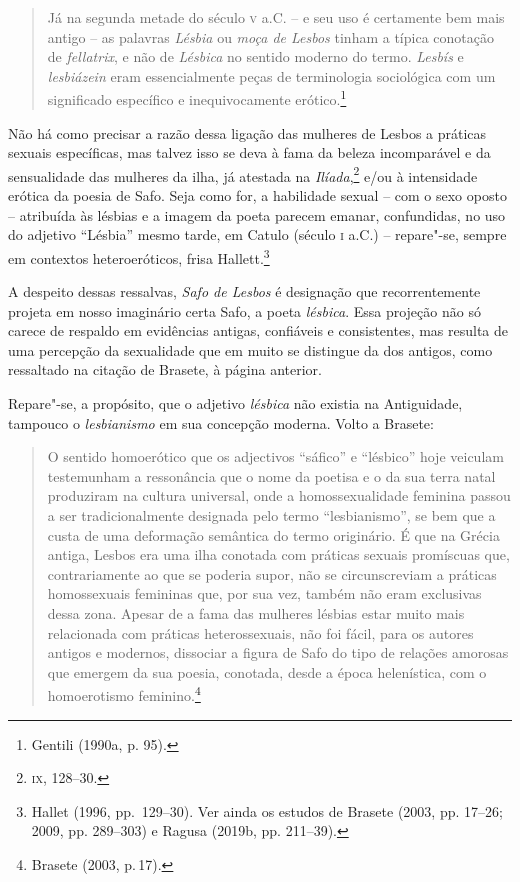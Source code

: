 \begin{quote}
Já na segunda metade do século \textsc{v} a.C. -- e seu uso é certamente bem mais antigo
-- as palavras \textit{Lésbia} ou \textit{moça de Lesbos} tinham a típica
conotação de \textit{fellatrix}, e não de \textit{Lésbica} no sentido moderno
do termo. \textit{Lesbís} e \textit{lesbiázein} eram essencialmente peças de
terminologia sociológica com um significado específico e inequivocamente
erótico.\footnote{ Gentili (1990a, p. 95).}
\end{quote}

Não há como precisar a razão dessa ligação das mulheres de Lesbos a práticas
sexuais específicas, mas talvez isso se deva à fama da beleza incomparável e da
sensualidade das mulheres da ilha, já atestada na \textit{Ilíada},\footnote{\textsc{ix}, 128--30.}
e/ou à intensidade erótica da poesia de Safo. Seja como for, a habilidade
sexual -- com o sexo oposto -- atribuída às lésbias e a imagem da poeta parecem
emanar, confundidas, no uso do adjetivo “Lésbia” mesmo tarde, em Catulo
(século \textsc{i} a.C.) -- repare"-se, sempre em contextos heteroeróticos, frisa Hallett.\footnote{ Hallet 
(1996, pp.~129--30). Ver ainda os estudos de Brasete (2003, pp. 17--26; 2009, pp. 289--303) e Ragusa (2019b, pp. 211--39).} 

A despeito dessas ressalvas, \textit{Safo de Lesbos} é designação que
recorrentemente projeta em nosso imaginário certa Safo, a poeta
\textit{lésbica}. Essa projeção
não só carece de respaldo em evidências antigas,
confiáveis e consistentes, mas resulta de uma percepção da
sexualidade que em muito se distingue da dos antigos, como ressaltado na citação de Brasete, à página anterior.

Repare"-se, a propósito, que o adjetivo \textit{lésbica} não existia na
Antiguidade, tampouco o \textit{lesbianismo} em sua concepção moderna.
Volto a Brasete:

\begin{quote}
O sentido homoerótico que os adjectivos ``sáfico'' e ``lésbico'' hoje veiculam testemunham a ressonância que o nome da poetisa e o da sua terra natal produziram na cultura universal, onde a homossexualidade feminina passou a ser tradicionalmente designada pelo termo ``lesbianismo'', se bem que a custa de uma deformação semântica do termo originário. É que na Grécia antiga, Lesbos era uma ilha conotada com práticas sexuais promíscuas que, contrariamente ao que se poderia supor, não se circunscreviam a práticas homossexuais femininas que, por sua vez, também não eram exclusivas dessa zona. Apesar de a fama das mulheres lésbias estar muito mais relacionada com práticas heterossexuais, não foi fácil, para os autores antigos e modernos, dissociar a figura de Safo do tipo de relações amorosas que emergem da sua poesia, conotada, desde a época helenística, com o homoerotismo feminino.\footnote{Brasete (2003, p.\,17).}
\end{quote}

